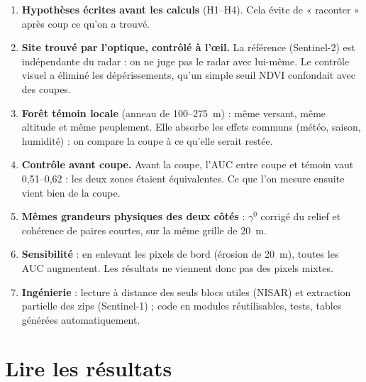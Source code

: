 \documentclass[11pt,a4paper]{article}
\begin{document}
\begin{enumerate}
\item \textbf{Hypothèses écrites avant les calculs} (H1--H4). Cela évite de « raconter » après coup ce qu'on a
  trouvé.
\item \textbf{Site trouvé par l'optique, contrôlé à l'œil.} La référence (Sentinel-2) est indépendante du radar :
  on ne juge pas le radar avec lui-même. Le contrôle visuel a éliminé les dépérissements, qu'un simple seuil NDVI
  confondait avec des coupes.
\item \textbf{Forêt témoin locale} (anneau de 100--275~m) : même versant, même altitude et même peuplement. Elle
  absorbe les effets communs (météo, saison, humidité) : on compare la coupe à ce qu'elle serait restée.
\item \textbf{Contrôle avant coupe.} Avant la coupe, l'AUC entre coupe et témoin vaut 0,51--0,62 : les deux zones
  étaient équivalentes. Ce que l'on mesure ensuite vient bien de la coupe.
\item \textbf{Mêmes grandeurs physiques des deux côtés} : $\gamma^0$ corrigé du relief et cohérence de paires
  courtes, sur la même grille de 20~m.
\item \textbf{Sensibilité} : en enlevant les pixels de bord (érosion de 20~m), toutes les AUC augmentent. Les
  résultats ne viennent donc pas des pixels mixtes.
\item \textbf{Ingénierie} : lecture à distance des seuls blocs utiles (NISAR) et extraction partielle des zips
  (Sentinel-1) ; code en modules réutilisables, tests, tables générées automatiquement.
\end{enumerate}

\section{Lire les résultats}
\end{document}
